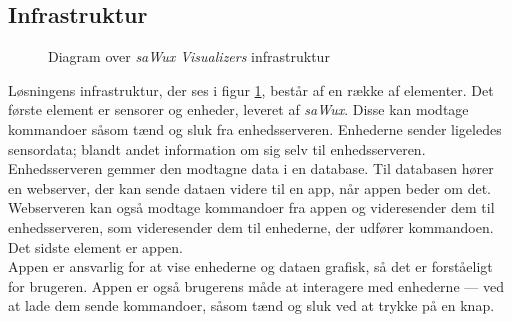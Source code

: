 \subsection{Infrastruktur}
\begin{figure}[H]
    \centering
    \caption[Diagram over infrastruktur]{Diagram over \emph{saWux Visualizers} infrastruktur}
    \label{img:teknisk:infra}
\end{figure}
Løsningens infrastruktur, der ses i figur \ref{img:teknisk:infra}, består af en række af elementer. Det første element er sensorer og enheder, leveret af \emph{saWux}. Disse kan modtage kommandoer såsom tænd og sluk fra enhedsserveren. Enhederne sender ligeledes sensordata; blandt andet information om sig selv til enhedsserveren. Enhedsserveren gemmer den modtagne data i en database. Til databasen hører en webserver, der kan sende dataen videre til en app, når appen beder om det. Webserveren kan også modtage kommandoer fra appen og videresender dem til enhedsserveren, som videresender dem til enhederne, der udfører kommandoen. Det sidste element er appen.\\ 

Appen er ansvarlig for at vise enhederne og dataen grafisk, så det er forståeligt for brugeren. Appen er også brugerens måde at interagere med enhederne — ved at lade dem sende kommandoer, såsom tænd og sluk ved at trykke på en knap.

